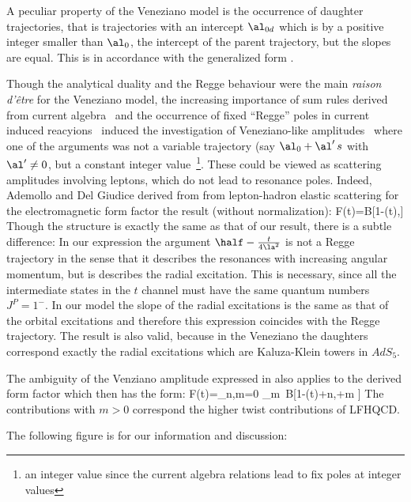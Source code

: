  A peculiar property of the Veneziano model is the occurrence of daughter
  trajectories, that is trajectories with an intercept $\al_{0d}$ which is by a positive
  integer smaller than $\al_0$, the intercept of the parent trajectory, but the slopes are equal.
This is in accordance with the generalized form .

Though the analytical duality and the Regge behaviour were the
main {\it raison d'\^etre} for the Veneziano model, the increasing
importance of sum rules derived from current algebra~\cite{} and
the occurrence of fixed ``Regge'' poles in current induced
reacyions~\cite{}  induced the investigation of Veneziano-like
amplitudes~\cite{Ademollo:1969wd,Bender:1970ew,Landshoff:1970ce}
where one of the arguments was not a variable trajectory (say
$\al_0+ \al'\,s $ with $\al'\neq 0$, but a constant integer
value~\footnote{an integer value since the current algebra
relations lead to fix poles at integer values}.   These could be
viewed as scattering amplitudes involving leptons, which do not
lead to resonance poles. Indeed, Ademollo and Del Giudice
\cite{Ademollo:1969wd} derived from from lepton-hadron elastic
scattering for the electromagnetic form factor the result (without
normalization): \beq {} F(t)=B[1-\al(t),] \enq Though
the structure is exactly the same as that of our result, there is
a subtle difference: In our expression the argument $\half -
\frac{t}{4 \la^2}$ is not a Regge trajectory in the sense that it
describes the resonances with increasing angular momentum, but is
describes the radial excitation. This is necessary, since all the
intermediate states in the $t$ channel must have the same quantum
numbers $J^P= 1^-$. In our model the slope of the radial
excitations is the same as that of the orbital excitations and
therefore this expression coincides with the Regge trajectory. The
result  is also valid, because in the Veneziano the
daughters correspond exactly the radial excitations which are
Kaluza-Klein towers in $AdS_5$.


The ambiguity of the Venziano amplitude expressed in 
also applies to the derived form factor  which then has
the form: \beq {} F(t)=\sum_{n,m=0} \be_m\,
B[1-\al(t)+n,+m ] \enq The contributions with $m>0$
correspond the higher twist contributions of LFHQCD.



\newpage

The following figure is for our information and discussion:


